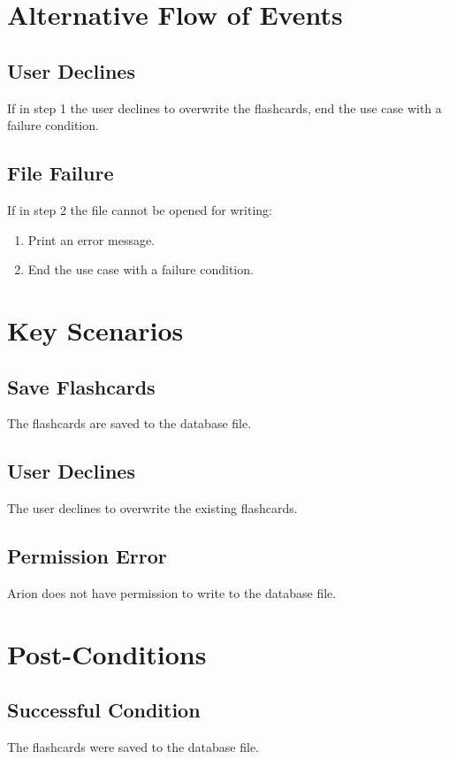 \documentclass{scrreprt}
\begin{document}
\section{Alternative Flow of Events}

    \subsection{User Declines}
    If in step 1 the user declines to overwrite the flashcards,
    end the use case with a failure condition.

    \subsection{File Failure}
    If in step 2 the file cannot be opened for writing:
    \begin{enumerate}[1.]
        \item Print an error message.
        \item End the use case with a failure condition.
    \end{enumerate}

\section{Key Scenarios}
    \subsection{Save Flashcards}
    The flashcards are saved to the database file.
    
    \subsection{User Declines}
    The user declines to overwrite the existing flashcards.

    \subsection{Permission Error}
    Arion does not have permission to write to the database file.

\section{Post-Conditions}
    \subsection{Successful Condition}
    The flashcards were saved to the database file.
    
\end{document}
